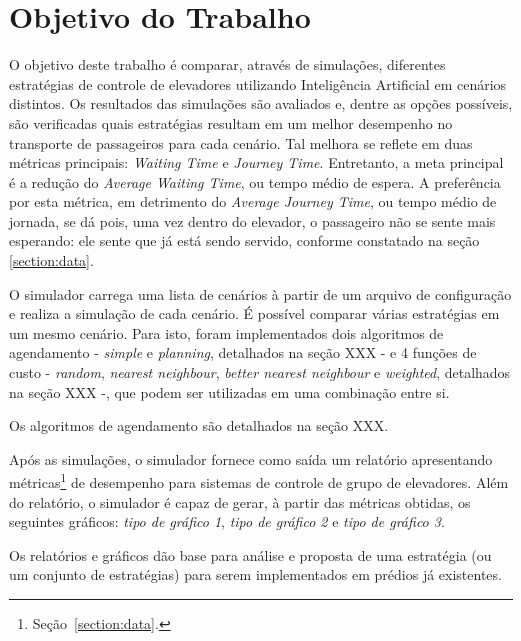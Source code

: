 \chapter{\label{chap:objectives}Objetivo do Trabalho}

O objetivo deste trabalho é comparar, através de simulações, diferentes
estratégias de controle de elevadores utilizando Inteligência Artificial em
cenários distintos. Os resultados das simulações são avaliados e, dentre as
opções possíveis, são verificadas quais estratégias resultam em um melhor
desempenho no transporte de passageiros para cada cenário. Tal melhora se
reflete em duas métricas principais: \textit{Waiting Time} e \textit{Journey
Time}. Entretanto, a meta principal é a redução do \textit{Average Waiting
Time}, ou tempo médio de espera. A preferência por esta métrica, em detrimento
do \textit{Average Journey Time}, ou tempo médio de jornada, se dá pois, uma vez
dentro do elevador, o passageiro não se sente mais esperando: ele sente que já
está sendo servido, conforme constatado na seção \ref{section:data}.

O simulador carrega uma lista de cenários à partir de um arquivo de configuração
e realiza a simulação de cada cenário. É possível comparar várias estratégias em
um mesmo cenário. Para isto, foram implementados dois algoritmos de agendamento
- \textit{simple} e \textit{planning}, detalhados na seção XXX - e 4 funções de
custo - \textit{random}, \textit{nearest neighbour}, \textit{better nearest
neighbour} e \textit{weighted}, detalhados na seção XXX -, que podem ser
utilizadas em uma combinação entre si.

Os algoritmos de agendamento são detalhados na seção XXX. 

Após as simulações, o simulador fornece como saída um relatório apresentando
métricas\footnote{Seção~\ref{section:data}.} de desempenho para sistemas de
controle de grupo de elevadores. Além do relatório, o simulador é capaz de
gerar, à partir das métricas obtidas, os seguintes gráficos: \textit{tipo de
gráfico 1}, \textit{tipo de gráfico 2} e \textit{tipo de gráfico 3}.


Os relatórios e gráficos dão base para análise e proposta de uma estratégia (ou
um conjunto de estratégias) para serem implementados em prédios já existentes.

